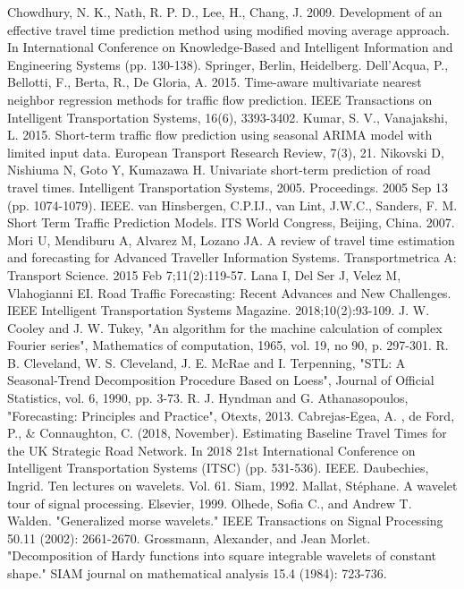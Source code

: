 \documentclass[letterpaper, 10 pt, conference]{ieeeconf}  %
\begin{document}
\begin{thebibliography}{00}
 Chowdhury, N. K., Nath, R. P. D., Lee, H., Chang, J. 2009. Development of an effective travel time prediction method using modified moving average approach. In International Conference on Knowledge-Based and Intelligent Information and Engineering Systems (pp. 130-138). Springer, Berlin, Heidelberg.
 Dell'Acqua, P., Bellotti, F., Berta, R., De Gloria, A. 2015. Time-aware multivariate nearest neighbor regression methods for traffic flow prediction. IEEE Transactions on Intelligent Transportation Systems, 16(6), 3393-3402.
 Kumar, S. V., Vanajakshi, L. 2015. Short-term traffic flow prediction using seasonal ARIMA model with limited input data. European Transport Research Review, 7(3), 21.
 Nikovski D, Nishiuma N, Goto Y, Kumazawa H. Univariate short-term prediction of road travel times. Intelligent Transportation Systems, 2005. Proceedings. 2005 Sep 13 (pp. 1074-1079). IEEE.
 van Hinsbergen, C.P.IJ., van Lint, J.W.C.,  Sanders, F. M. Short Term Traffic Prediction Models. ITS World Congress, Beijing, China. 2007.
 Mori U, Mendiburu A, Alvarez M, Lozano JA. A review of travel time estimation and forecasting for Advanced Traveller Information Systems. Transportmetrica A: Transport Science. 2015 Feb 7;11(2):119-57.
 Lana I, Del Ser J, Velez M, Vlahogianni EI. Road Traffic Forecasting: Recent Advances and New Challenges. IEEE Intelligent Transportation Systems Magazine. 2018;10(2):93-109.
 J. W. Cooley and J. W. Tukey, "An algorithm for the machine calculation of complex Fourier series", Mathematics of computation, 1965, vol. 19, no 90, p. 297-301.
 R. B. Cleveland, W. S. Cleveland, J. E. McRae and I. Terpenning, "STL: A Seasonal-Trend Decomposition Procedure Based on Loess", Journal of Official Statistics, vol. 6, 1990, pp. 3-73.
 R. J. Hyndman and G. Athanasopoulos, "Forecasting: Principles and Practice", Otexts, 2013.
 Cabrejas-Egea, A. , de Ford, P., \& Connaughton, C. (2018, November). Estimating Baseline Travel Times for the UK Strategic Road Network. In 2018 21st International Conference on Intelligent Transportation Systems (ITSC) (pp. 531-536). IEEE.
 Daubechies, Ingrid. Ten lectures on wavelets. Vol. 61. Siam, 1992.
 Mallat, Stéphane. A wavelet tour of signal processing. Elsevier, 1999.
 Olhede, Sofia C., and Andrew T. Walden. "Generalized morse wavelets." IEEE Transactions on Signal Processing 50.11 (2002): 2661-2670.
 Grossmann, Alexander, and Jean Morlet. "Decomposition of Hardy functions into square integrable wavelets of constant shape." SIAM journal on mathematical analysis 15.4 (1984): 723-736.
\end{thebibliography}
\end{document}
